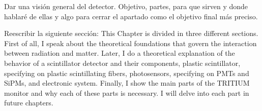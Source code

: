 Dar una visión general del detector. Objetivo, partes, para que sirven y donde hablaré de ellas y algo para cerrar el apartado como el objetivo final más preciso.

Reescribir la siguiente sección:
This Chapter is divided in three different sections. First of all, I speak about the theoretical foundations that govern the interaction between radiation and matter. Later, I do a theoretical explanation of the behavior of a scintillator detector and their components, plastic scintillator, specifying on plastic scintillating fibers, photosensors, specifying on PMTs and SiPMs, and electronic system. Finally, I show the main parts of the TRITIUM monitor and why each of these parts is necessary. I will delve into each part in future chapters.